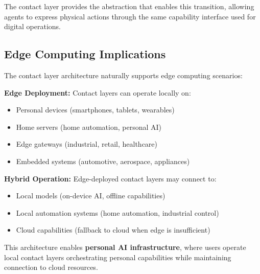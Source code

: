 The contact layer provides the abstraction that enables this transition, allowing agents to express physical actions through the same capability interface used for digital operations.

\subsection{Edge Computing Implications}

The contact layer architecture naturally supports edge computing scenarios:

\textbf{Edge Deployment:} Contact layers can operate locally on:
\begin{itemize}[leftmargin=*]
\item Personal devices (smartphones, tablets, wearables)
\item Home servers (home automation, personal AI)
\item Edge gateways (industrial, retail, healthcare)
\item Embedded systems (automotive, aerospace, appliances)
\end{itemize}

\textbf{Hybrid Operation:} Edge-deployed contact layers may connect to:
\begin{itemize}[leftmargin=*]
\item Local models (on-device AI, offline capabilities)
\item Local automation systems (home automation, industrial control)
\item Cloud capabilities (fallback to cloud when edge is insufficient)
\end{itemize}

This architecture enables \textbf{personal AI infrastructure}, where users operate local contact layers orchestrating personal capabilities while maintaining connection to cloud resources.
